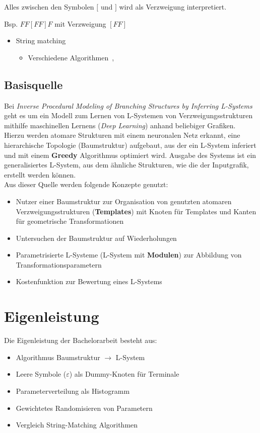 \documentclass[11pt]{article}
\begin{document}
    \newpage
    Alles zwischen den Symbolen $[$ und $]$ wird als Verzweigung interpretiert.
    \begin{center}
        Bsp. $FF[FF]F$ mit Verzweigung $[FF]$
    \end{center}

    \begin{itemize}
        \item String matching~\cite{6}
        \begin{itemize}
            \item Verschiedene Algorithmen~\cite{7},~\cite{8}
        \end{itemize}
    \end{itemize}

    \subsection{Basisquelle}
    Bei \textit{Inverse Procedural Modeling of Branching Structures by Inferring L-Systems}\cite{2} geht es um ein
    Modell zum Lernen von L-Systemen von Verzweigungsstrukturen mithilfe maschinellen Lernens (\textit{Deep
    Learning}) anhand beliebiger Grafiken.
    Hierzu werden atomare Strukturen mit einem neuronalen Netz erkannt, eine hierarchische Topologie (Baumstruktur)
    aufgebaut, aus der ein L-System inferiert und mit einem \textbf{Greedy} Algorithmus optimiert wird.
    Ausgabe des Systems ist ein generalisiertes L-System, aus dem ähnliche Strukturen, wie die der Inputgrafik,
    erstellt werden können.\\
    Aus dieser Quelle werden folgende Konzepte genutzt:
    \begin{itemize}
        \item Nutzer einer Baumstruktur zur Organisation von genutzten atomaren Verzweigungsstrukturen
        (\textbf{Templates}) mit Knoten für Templates und Kanten für geometrische Transformationen
        \item Untersuchen der Baumstruktur auf Wiederholungen
        \item Parametrisierte L-Systeme (L-System mit \textbf{Modulen}) zur Abbildung von Transformationsparametern
        \item Kostenfunktion zur Bewertung eines L-Systems
    \end{itemize}


    \section{Eigenleistung}
    Die Eigenleistung der Bachelorarbeit besteht aus:
    \begin{itemize}
        \item Algorithmus Baumstruktur $\rightarrow$ L-System
        \item Leere Symbole ($\varepsilon$) als Dummy-Knoten für Terminale
        \item Parameterverteilung als Histogramm
        \item Gewichtetes Randomisieren von Parametern
        \item Vergleich String-Matching Algorithmen
    \end{itemize}
\end{document}

